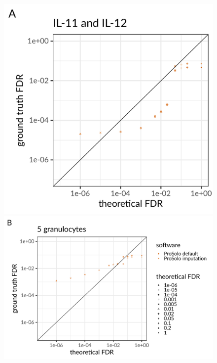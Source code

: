 \documentclass[authoryear,preprint,11pt]{scrartcl}
\begin{document}
\begin{figure}[!tpb]
 \begin{minipage}[t]{.4\linewidth}
 \vspace{0pt}
  \includegraphics[width=\linewidth]{figs/Dong2017/Dong2017_prosolo_FDR_ground_truth_vs_theoretical.pdf} \newline
 \end{minipage}
 \begin{minipage}[t]{.59\linewidth}
 \vspace{0pt}
  \includegraphics[width=\linewidth]{figs/Laehnemann2017/Laehnemann2017_prosolo__FDR_ground_truth_vs_theoretical.pdf} \newline

\end{minipage}
\end{figure}
\end{document}
